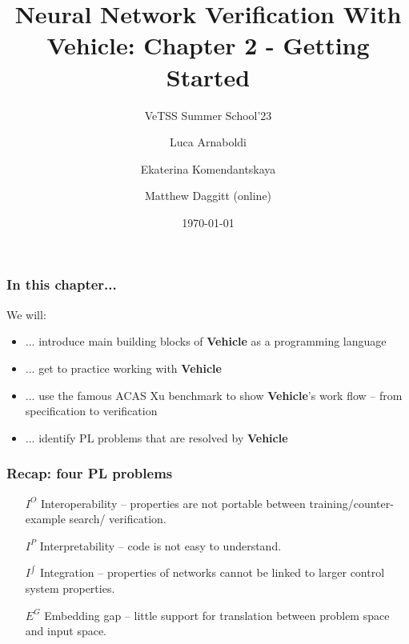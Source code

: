 \documentclass[t,compress,aspectratio=169]{beamer}
\title{Neural Network Verification With Vehicle: Chapter 2 - Getting Started}
\subtitle{VeTSS Summer School'23}  %
\date{\today}
\author{Luca Arnaboldi\inst{1}  \and Ekaterina Komendantskaya\inst{2} \and Matthew Daggitt (online) \inst{3}}
\institute{$^{1}$University of Birmingham $\cdot$ $^{2}$University of Southampton $\cdot$ $^{3}$Heriot-Watt University}
\begin{document}

\setbackground
\begin{frame} %
  \titlepage
\end{frame}
\unsetbackground

\begin{frame}
\frametitle{In this chapter...}

We will:

\begin{itemize}[<+->]
\item  ... introduce main building blocks of \textbf{Vehicle} as a programming language
\item ... get to practice working with \textbf{Vehicle}
\item ... use the famous ACAS Xu benchmark to show \textbf{Vehicle}'s work flow --
from specification to verification
\item ... identify PL problems that are resolved by \textbf{Vehicle}

\end{itemize}

\end{frame}


\begin{frame}
\frametitle{Recap: four PL problems}

\begin{itemize}
\item[$I^O$] Interoperability -- properties are not portable between training/counter-example search/ verification.

\item[$I^{P}$] Interpretability -- code is not easy to understand.

\item[$I^{\int}$] Integration -- properties of networks cannot be linked to larger control system properties.

\item[$E^G$] Embedding gap -- little support for translation between problem space  and input space.
\end{itemize}
\end{frame}
\end{document}
